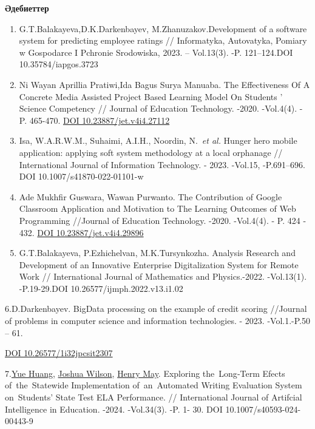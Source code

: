 \begin{center}
{\bfseries Әдебиеттер}
\end{center}

\begin{references}
\begin{enumerate}
\def\labelenumi{\arabic{enumi}.}
\item
  G.T.Balakayeva,D.K.Darkenbayev, M.Zhanuzakov.Development of a software
  system for predicting employee ratings // Informatyka, Autovatyka,
  Pomiary w Gospodarce I Pchronie Srodowiska, 2023. -- Vol.13(3). -P.
  121--124.DOI 10.35784/iapgos.3723
\item
  Ni Wayan Aprillia Pratiwi,Ida Bagus Surya Manuaba. The Effectiveness
  Of A Concrete Media Assisted Project Based Learning Model On Students
  ' Science Competency // Journal of Education
  Technology. -2020. -Vol.4(4). - P. 465-470.
  \href{https://doi.org/10.23887/jet.v4i4.27112}{DOI
  10.23887/jet.v4i4.27112}
\item
  Isa, W.A.R.W.M., Suhaimi, A.I.H., Noordin, N.~\emph{et al.} Hunger
  hero mobile application: applying soft system methodology at a local
  orphanage // International Journal of Information Technology. - 2023.
  -Vol.15, -P.691--696. DOI 10.1007/s41870-022-01101-w
\item
  Ade Mukhfir Guswara, Wawan Purwanto. The Contribution of Google
  Classroom Application and Motivation to The Learning Outcomes of Web
  Programming //Journal of Education Technology. -2020. -Vol.4(4). - P.
  424 - 432. \href{https://doi.org/10.23887/jet.v4i4.29896}{DOI
  10.23887/jet.v4i4.29896}
\item
  G.T.Balakayeva, P.Ezhichelvan, M.K.Tursynkozha. Analysis Research and
  Development of an Innovative Enterprise Digitalization System for
  Remote Work // International Journal of Mathematics and Physics.-2022.
  -Vol.13(1). -P.19-29.DOI 10.26577/ijmph.2022.v13.i1.02
\end{enumerate}

6.D.Darkenbayev. BigData processing on the example of credit scoring
//Journal of problems in computer science and information technologies.
- 2023. -Vol.1.-P.50 -- 61.

\href{https://doi.org/10.26577/1i32jpcsit2307}{DOI
10.26577/1i32jpcsit2307}

7.\href{https://link.springer.com/article/10.1007/s40593-024-00443-9\#auth-Yue-Huang-Aff1}{Yue
Huang},
\href{https://link.springer.com/article/10.1007/s40593-024-00443-9\#auth-Joshua-Wilson-Aff2}{Joshua
Wilson},
\href{https://link.springer.com/article/10.1007/s40593-024-00443-9\#auth-Henry-May-Aff2}{Henry
May}. Exploring the~Long‑Term Efects of~the~Statewide Implementation
of~an~Automated Writing Evaluation System on~Students' State Test ELA
Performance. // International Journal of Artifcial Intelligence in
Education. -2024. -Vol.34(3). -P. 1- 30. DOI 10.1007/s40593-024-00443-9


\end{references}
